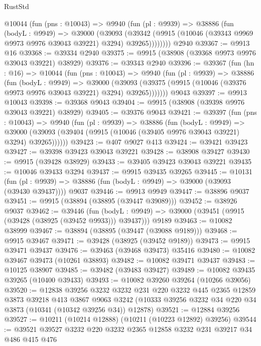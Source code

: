 \begin{lexlean}{RustStd}
\begin{coremodule}
      @10044
        (fun (pns : @10043) =>
        @9940
          (fun (pl : @9939) =>
          @38886
            (fun (bodyL : @9949) =>
            @39000
              (@39093
                (@39342
                  (@9915 (@10046 (@39343 @9969 @9973 @9976 @39043 @39221) @3294) @39265))))))))
    @2940
@39367 := @9913 @16
@39368 := @39334 @2940
@39375 := @9915 (@38908 (@39368 @9973 @9976 @39043 @39221) @38929)
@39376 := @39343 @2940
@39396 := @39367
    (fun (hn : @16) =>
    @10044
      (fun (pns : @10043) =>
      @9940
        (fun (pl : @9939) =>
        @38886
          (fun (bodyL : @9949) =>
          @39000
            (@39093 (@39375 (@9915 (@10046 (@39376 @9973 @9976 @39043 @39221) @3294) @39265)))))))
    @9043
@39397 := @9913 @10043
@39398 := @39368 @9043
@39404 := @9915 (@38908 (@39398 @9976 @39043 @39221) @38929)
@39405 := @39376 @9043
@39421 := @39397
    (fun (pns : @10043) =>
    @9940
      (fun (pl : @9939) =>
      @38886
        (fun (bodyL : @9949) =>
        @39000 (@39093 (@39404 (@9915 (@10046 (@39405 @9976 @39043 @39221) @3294) @39265))))))
@39423 := @407 @9027 @413
@39424 := @39421 @39423
@39427 := @39398 @39423 @39043 @39221
@39428 := @38908 @39427
@39430 := @9915 (@39428 @38929)
@39433 := @39405 @39423 @39043 @39221
@39435 := @10046 @39433 @3294
@39437 := @9915 @39435 @39265
@39445 := @10131
    (fun (pl : @9939) => @38886 (fun (bodyL : @9949) => @39000 (@39093 (@39430 @39437))))
    @9037
@39446 := @9913 @9949
@39447 := @38896 @9037
@39451 := @9915 (@38894 (@38895 (@39447 @39089)))
@39452 := @38926 @9037
@39462 := @39446
    (fun (bodyL : @9949) => @39000 (@39451 (@9915 (@39428 (@38925 (@39452 @9933))) @39437)))
    @9189
@39463 := @10082 @38999
@39467 := @38894 (@38895 (@39447 (@39088 @9189)))
@39468 := @9915 @39467
@39471 := @39428 (@38925 (@39452 @9189))
@39473 := @9915 @39471 @39437
@39476 := @39463 (@39468 @39473) @35416
@39480 := @10082 @39467 @39473 (@10261 @38893)
@39482 := @10082 @39471 @39437
@39483 := @10125 @38907
@39485 := @39482 (@39483 @39427)
@39489 := @10082 @39435 @39265 (@10400 @39433)
@39493 := @10082 @39260 @39264 (@10266 @39056)
@39520 := @12838
    @39256
    @3232
    @3232
    @231
    @220
    @3232
    @445
    @2365
    @12859
    @3873
    @39218
    @413
    @3867
    @9063
    @3242
    (@10333 @39256 @3232 @34 @220 @34 @3873 (@10341 (@10342 @39256 @34)) @12878)
@39521 := @12884 @39256
@39527 := @10211 (@10214 @12888) (@10211 (@10223 @12892) @39256)
@39544 := @39521
    @39527
    @3232
    @220
    @3232
    @2365
    @12858
    @3232
    @231
    @39217
    @34
    @486
    @415
    @476

\end{coremodule}
\end{lexlean}
